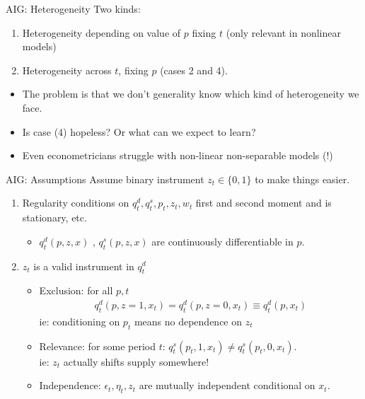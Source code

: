 \documentclass[xcolor=pdftex,dvipsnames,table,mathserif,aspectratio=169]{beamer}
\begin{document}
\begin{frame}{AIG: Heterogeneity}
Two kinds:
\begin{enumerate}
\item Heterogeneity depending on value of $p$ fixing $t$ (only relevant in nonlinear models)
\item Heterogeneity across $t$, fixing $p$ (cases 2 and 4).
\end{enumerate}
\begin{itemize}
\item The problem is that we don't generality know which kind of heterogeneity we face.
\item Is case (4) hopeless? Or what can we expect to learn?
\item Even econometricians struggle with non-linear non-separable models (!)
\end{itemize}
\end{frame}

\begin{frame}{AIG: Assumptions}
Assume binary instrument $z_{t} \in \{0,1\}$ to make things easier.
\begin{enumerate}
\item Regularity conditions on $q_t^d, q_t^s,p_t,z_t,w_t$ first and second moment and is stationary, etc.
\begin{itemize}
\item  $q_t^d(p,z,x)$ ,  $q_t^s(p,z,x)$ are continuously differentiable in $p$.
\end{itemize}
\item $z_t$ is a valid instrument in $q_t^d$
\begin{itemize}
\item Exclusion: for all $p,t$ 
\begin{eqnarray*}
q_t^d(p,z=1,x_t) = q_t^d(p,z=0,x_t) \equiv q_t^d(p,x_t)
\end{eqnarray*}
ie: conditioning on $p_t$ means no dependence on $z_t$
\item Relevance: for some period $t$: $q_t^s(p_t,1,x_t) \neq q_t^s(p_t,0,x_t)$.\\
ie: $z_t$ actually shifts supply somewhere!
\item Independence: $\epsilon_t, \eta_t, z_t$ are mutually independent conditional on $x_t$.
\end{itemize}
\end{enumerate}
\end{frame}
\end{document}

